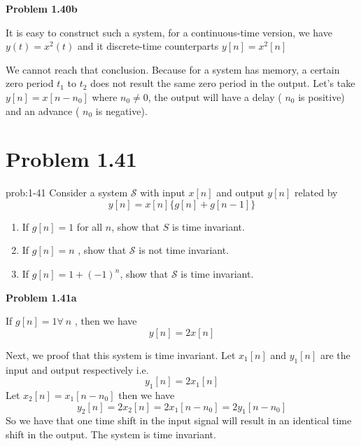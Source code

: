 \documentclass[koma,a4paper,utopia,12pt,listings-color,microtype,paralist,colorlinks,urlcolor=red]{org-article}
\begin{document}
\textbf{Problem 1.40b}

It is easy to construct such a system, for a continuous-time version, we have
\(y(t) = x^{2}(t)\) and it discrete-time counterparts \(y[n] = x^{2}[n]\)

We cannot reach that conclusion. Because for a system has memory, a certain
zero period \(t_{1}\) to \(t_{2}\) does not result the same zero period in the
output. Let's take \(y[n] = x[n-n_{0}]\) where \(n_{0}\neq 0\), the output will
have a delay ( \(n_{0}\) is positive) and an advance ( \(n_{0}\) is negative).
\section{Problem 1.41}
\label{sec:orgb5785da}


\begin{prob}[]{prob:1-41}
Consider a system \(\mathcal{S}\) with input \(x[n]\) and output \(y[n]\)
related by
\begin{equation*}
y[n] = x[n]\{ g[n] + g[n-1] \}
\end{equation*}

\begin{enumerate}
\item If \(g[n] = 1\) for all \(n\), show that \(S\) is time invariant.
\item If \(g[n] = n\) , show that \(\mathcal{S}\) is not time invariant.
\item If \(g[n] = 1 + (-1)^{n}\), show that \(\mathcal{S}\) is time invariant.
\end{enumerate}
\label{prob:1-41}
\end{prob}

\textbf{Problem 1.41a}

If \(g[n] = 1 \forall \ n\) , then we have
\begin{equation*}
y[n] = 2x[n]
\end{equation*}

Next, we proof that this system is time invariant. Let \(x_{1}[n]\) and
\(y_{1}[n]\) are the input and output respectively i.e.
\begin{equation*}
y_{1}[n] = 2x_{1}[n]
\end{equation*}
Let \(x_{2}[n] = x_{1}[n-n_{0}]\) then we have
\begin{equation*}
y_{2}[n] = 2x_{2}[n] = 2x_{1}[n-n_{0}] = 2y_{1}[n-n_{0}]
\end{equation*}
So we have that one time shift in the input signal will result in an identical
time shift in the output. The system is time invariant.
\end{document}
